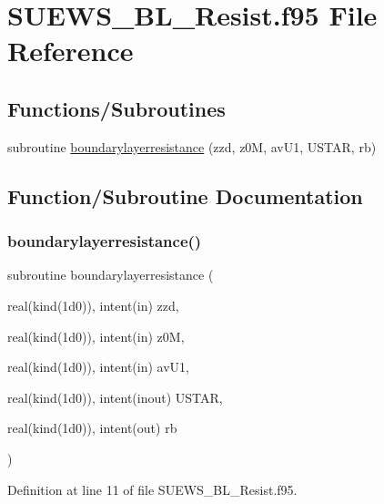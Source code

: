 \hypertarget{_s_u_e_w_s___b_l___resist_8f95}{}\section{S\+U\+E\+W\+S\+\_\+\+B\+L\+\_\+\+Resist.\+f95 File Reference}
\label{_s_u_e_w_s___b_l___resist_8f95}
\subsection*{Functions/\+Subroutines}
\begin{DoxyCompactItemize}
\item 
subroutine \hyperlink{_s_u_e_w_s___b_l___resist_8f95_a1892d7a5ef6383934b4530b744268d15}{boundarylayerresistance} (zzd, z0M, av\+U1, U\+S\+T\+AR, rb)
\end{DoxyCompactItemize}


\subsection{Function/\+Subroutine Documentation}
\mbox{\label{_s_u_e_w_s___b_l___resist_8f95_a1892d7a5ef6383934b4530b744268d15}} 
\subsubsection{\texorpdfstring{boundarylayerresistance()}{boundarylayerresistance()}}
{\footnotesize\ttfamily subroutine boundarylayerresistance (\begin{DoxyParamCaption}\item[{real(kind(1d0)), intent(in)}]{zzd,  }\item[{real(kind(1d0)), intent(in)}]{z0M,  }\item[{real(kind(1d0)), intent(in)}]{av\+U1,  }\item[{real(kind(1d0)), intent(inout)}]{U\+S\+T\+AR,  }\item[{real(kind(1d0)), intent(out)}]{rb }\end{DoxyParamCaption})}



Definition at line 11 of file S\+U\+E\+W\+S\+\_\+\+B\+L\+\_\+\+Resist.\+f95.

